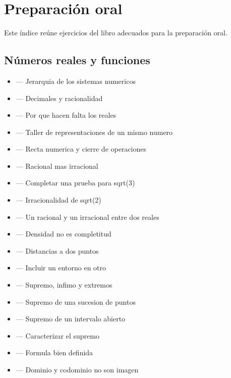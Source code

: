 \documentclass[10pt,a4paper,oneside,openany]{book}
\begin{document}
\chapter*{Preparación oral}
Este índice reúne ejercicios del libro adecuados para la preparación oral.
\section*{Números reales y funciones}
\begin{itemize}
\item {} — Jerarquia de los sistemas numericos
\item {} — Decimales y racionalidad
\item {} — Por que hacen falta los reales
\item {} — Taller de representaciones de un mismo numero
\item {} — Recta numerica y cierre de operaciones
\item {} — Racional mas irracional
\item {} — Completar una prueba para sqrt(3)
\item {} — Irracionalidad de sqrt(2)
\item {} — Un racional y un irracional entre dos reales
\item {} — Densidad no es completitud
\item {} — Distancias a dos puntos
\item {} — Incluir un entorno en otro
\item {} — Supremo, infimo y extremos
\item {} — Supremo de una sucesion de puntos
\item {} — Supremo de un intervalo abierto
\item {} — Caracterizar el supremo
\item {} — Formula bien definida
\item {} — Dominio y codominio no son imagen

\end{itemize}
\end{document}
